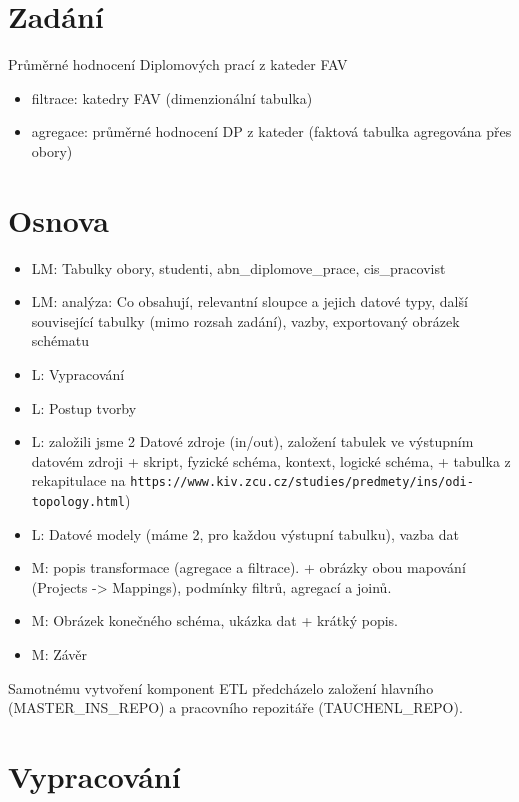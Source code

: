 \section{Zadání}

Průměrné hodnocení Diplomových prací z kateder FAV

\begin{itemize}
    \item filtrace: katedry FAV (dimenzionální tabulka)
    \item agregace: průměrné hodnocení DP z kateder (faktová tabulka agregována přes obory)
\end{itemize}

\section{Osnova}

\begin{itemize}
    \item LM: Tabulky obory, studenti, abn\_diplomove\_prace, cis\_pracovist
    \item LM: analýza: Co obsahují, relevantní sloupce a jejich datové typy, další související tabulky (mimo rozsah zadání), vazby, exportovaný obrázek schématu
    \item L: Vypracování
    \item L: Postup tvorby
    \item L: založili jsme 2 Datové zdroje (in/out), založení tabulek ve výstupním datovém zdroji + skript, fyzické schéma, kontext, logické schéma, + tabulka z rekapitulace na \nolinkurl{https://www.kiv.zcu.cz/studies/predmety/ins/odi-topology.html})
    \item L: Datové modely (máme 2, pro každou výstupní tabulku), vazba dat
    \item M: popis transformace (agregace a filtrace). + obrázky obou mapování (Projects -> Mappings), podmínky filtrů, agregací a joinů.
    \item M: Obrázek konečného schéma, ukázka dat + krátký popis.
    \item M: Závěr
\end{itemize}

Samotnému vytvoření komponent ETL předcházelo založení hlavního (MASTER\_INS\_REPO) a pracovního repozitáře (TAUCHENL\_REPO).

\section{Vypracování}

